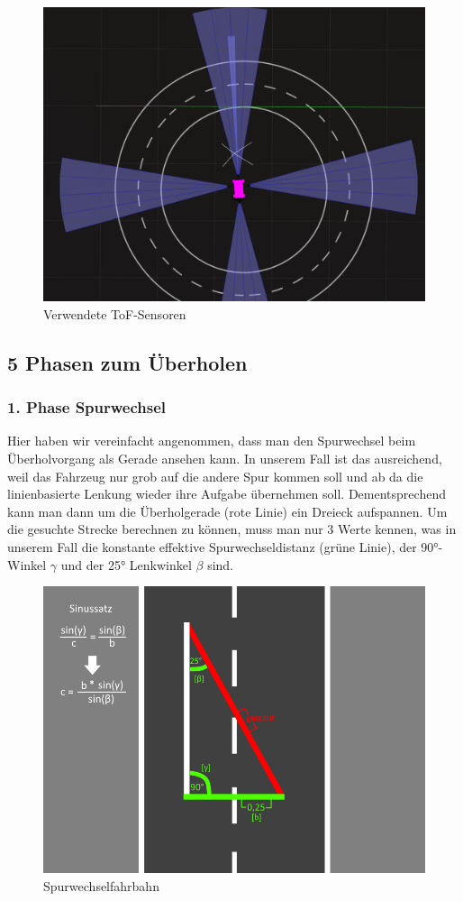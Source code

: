 \begin{figure}[H]
	\centering	
	\includegraphics[width=.4\textwidth]{img/tof_sensoren}
	\caption[Verwendete ToF-Sensoren]{Verwendete ToF-Sensoren}
	\label{fig:tof_sensoren}
\end{figure}

\subsection{5 Phasen zum Überholen}

\subsubsection{1. Phase Spurwechsel}
Hier haben wir vereinfacht angenommen, dass man den Spurwechsel beim Überholvorgang als Gerade ansehen kann. In unserem Fall ist das ausreichend, weil das Fahrzeug nur grob auf die andere Spur kommen soll und ab da die linienbasierte Lenkung wieder ihre Aufgabe übernehmen soll. Dementsprechend kann man dann um die Überholgerade (rote Linie) ein Dreieck aufspannen. Um die gesuchte Strecke berechnen zu können, muss man nur 3 Werte kennen, was in unserem Fall die konstante effektive Spurwechseldistanz (grüne Linie), der 90°-Winkel $\gamma$ und der 25° Lenkwinkel $\beta$ sind.

\begin{figure}[H]
	\centering	
	\includegraphics[width=.8\textwidth]{img/ueberholen}
	\caption[Spurwechselfahrbahn]{Spurwechselfahrbahn}
	\label{fig:ueberholen}
\end{figure}

